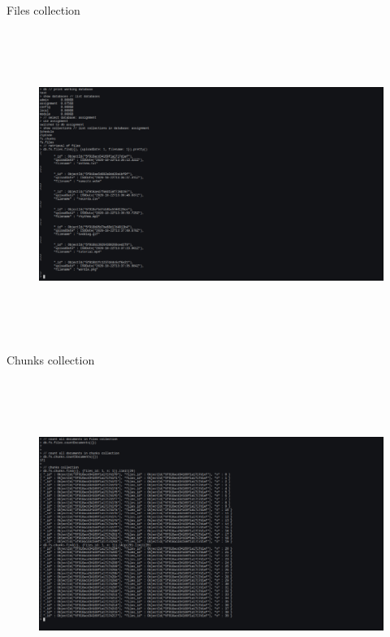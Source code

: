 \documentclass[a4paper,11pt,openright]{report}
\begin{document}
\pagebreak

{\footnotesize Files collection}
\begin{figure}[ht!]
\includegraphics[width=20cm,height=10cm,keepaspectratio]{image3.pdf}
\centering
\end{figure}

\vspace{20px}

{\footnotesize Chunks collection}
\begin{figure}[ht!]
\includegraphics[width=20cm,height=10cm,keepaspectratio]{image4.pdf}
\centering
\end{figure}
\end{document}
